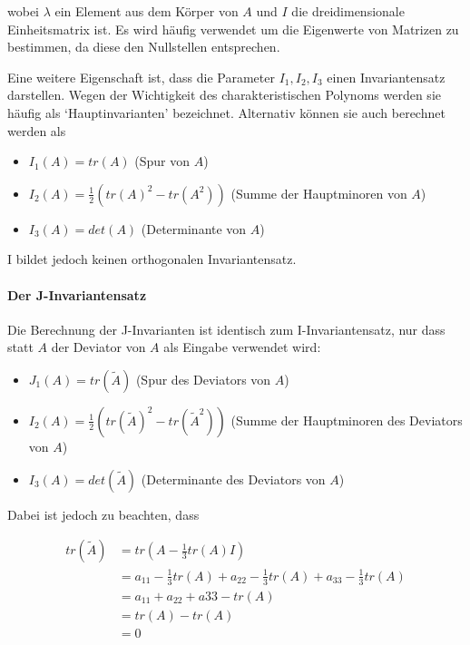 \documentclass[a4paper,fontsize=12pt,toc=bib,halfparskip]{scrartcl}
\begin{document}
wobei $\lambda$ ein Element aus dem K\"orper von $A$ und $I$ die dreidimensionale Einheitsmatrix ist. Es wird h\"aufig verwendet um die Eigenwerte von Matrizen zu bestimmen, da diese den Nullstellen entsprechen.

Eine weitere Eigenschaft ist, dass die Parameter $I_1, I_2, I_3$ einen Invariantensatz darstellen. Wegen der Wichtigkeit des charakteristischen Polynoms werden sie h\"aufig als `Hauptinvarianten' bezeichnet. Alternativ k\"onnen sie auch berechnet werden als

\begin{itemize}
	\item $I_1(A) = tr(A)$ (Spur von $A$)
	\item $I_2(A) = \frac{1}{2}(tr(A)^2 - tr(A^2))$ (Summe der Hauptminoren von $A$)
	\item $I_3(A) = det(A)$ (Determinante von $A$)
\end{itemize}
I bildet jedoch keinen orthogonalen Invariantensatz.

\paragraph{Der J-Invariantensatz}
Die Berechnung der J-Invarianten ist identisch zum I-Invariantensatz, nur dass statt $A$ der Deviator von $A$ als Eingabe verwendet wird:

\begin{itemize}
	\item $J_1(A) = tr(\tilde{A})$ (Spur des Deviators von $A$)
	\item $I_2(A) = \frac{1}{2}(tr(\tilde{A})^2 - tr(\tilde{A}^2))$ (Summe der Hauptminoren des Deviators von $A$)
\item $I_3(A) = det(\tilde{A})$ (Determinante des Deviators von $A$)
\end{itemize}

Dabei ist jedoch zu beachten, dass

\begin{equation}
	\begin{split}
	tr(\tilde{A}) &= tr(A - \frac{1}{3}tr(A)I)\\
	&= a_{11} - \frac{1}{3} tr(A) + a_{22} - \frac{1}{3} tr(A) + a_{33} - \frac{1}{3} tr(A)\\
	&= a_{11} + a_{22} + a{33} - tr(A)\\
	&= tr(A) - tr(A)\\
	&= 0
	\end{split}
\end{equation}
\end{document}
